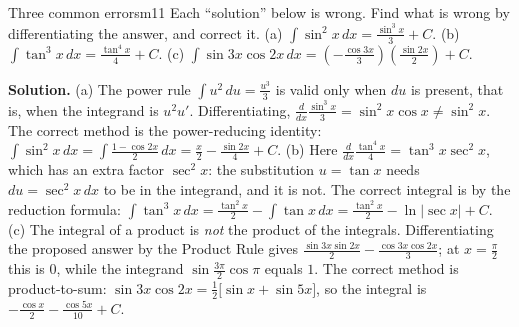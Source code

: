 \documentclass[11pt]{article}
\begin{document}
\begin{exmp}{Three common errors}{m11}
Each ``solution'' below is wrong. Find what is wrong by differentiating the answer, and correct it. (a) $\int\sin^2x\,dx=\frac{\sin^3x}3+C$. (b) $\int\tan^3x\,dx=\frac{\tan^4x}4+C$. (c) $\int\sin3x\cos2x\,dx=\left(-\frac{\cos3x}3\right)\left(\frac{\sin2x}2\right)+C$.

\textbf{Solution.} (a) The power rule $\int u^2\,du=\frac{u^3}3$ is valid only when $du$ is present, that is, when the integrand is $u^2u'$. Differentiating, $\frac{d}{dx}\frac{\sin^3x}3=\sin^2x\cos x\ne\sin^2x$. The correct method is the power-reducing identity: $\int\sin^2x\,dx=\int\frac{1-\cos2x}2\,dx=\frac x2-\frac{\sin2x}4+C$.
(b) Here $\frac{d}{dx}\frac{\tan^4x}4=\tan^3x\sec^2x$, which has an extra factor $\sec^2x$: the substitution $u=\tan x$ needs $du=\sec^2x\,dx$ to be in the integrand, and it is not. The correct integral is by the reduction formula: $\int\tan^3x\,dx=\frac{\tan^2x}2-\int\tan x\,dx=\frac{\tan^2x}2-\ln\lvert\sec x\rvert+C$.
(c) The integral of a product is \emph{not} the product of the integrals. Differentiating the proposed answer by the Product Rule gives $\frac{\sin3x\sin2x}2-\frac{\cos3x\cos2x}3$; at $x=\frac\pi2$ this is $0$, while the integrand $\sin\frac{3\pi}2\cos\pi$ equals $1$. The correct method is product-to-sum: $\sin3x\cos2x=\frac12\big[\sin x+\sin5x\big]$, so the integral is $-\frac{\cos x}2-\frac{\cos5x}{10}+C$.
\end{exmp}
\end{document}
